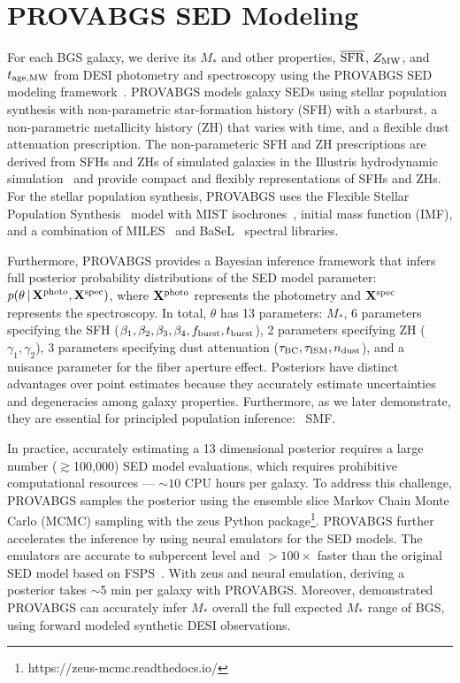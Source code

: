 \section{PROVABGS SED Modeling} \label{sec:provabgs}
For each BGS galaxy, we derive its $M_*$ and other properties, 
$\overline{\rm SFR}$, $Z_{\rm MW}$, and $t_{\rm age, MW}$ from DESI
photometry and spectroscopy using the PROVABGS SED modeling
framework~\citep{hahn2022}.  
PROVABGS models galaxy SEDs using stellar population synthesis with
non-parametric star-formation history (SFH) with a starburst, a non-parametric
metallicity history (ZH) that varies with time, and a flexible dust
attenuation prescription.
The non-parameteric SFH and ZH prescriptions are derived from SFHs and ZHs of
simulated galaxies in the Illustris hydrodynamic
simulation~\citep{vogelsberger2014, genel2014, nelson2015} and provide compact 
and flexibly representations of SFHs and ZHs.
For the stellar population synthesis, PROVABGS uses the Flexible Stellar
Population Synthesis~\citep[FSPS;][]{conroy2009, conroy2010b} model with MIST
isochrones~\citep{paxton2011, paxton2013, paxton2015, choi2016, dotter2016},
\cite{chabrier2003} initial mass function (IMF), and a combination of
MILES~\citep{sanchez-blazquez2006} and BaSeL~\citep{lejeune1997, lejeune1998,
westera2002} spectral libraries.

Furthermore, PROVABGS provides a Bayesian inference framework that infers
full posterior probability distributions of the SED model parameter:
$p(\theta\,|\, {\bf X}^{\rm photo}, {\bf X}^{\rm spec})$, where 
${\bf X}^{\rm photo}$ represents the photometry and ${\bf X}^{\rm spec}$ 
represents the spectroscopy. 
In total, $\theta$ has 13 parameters: $M_*$, 6 parameters specifying the SFH
($\beta_1, \beta_2, \beta_3, \beta_4, f_{\rm burst}, t_{\rm burst}$), 2
parameters specifying ZH ($\gamma_1, \gamma_2$), 3 parameters specifying
dust attenuation ($\tau_{\rm BC}, \tau_{\rm ISM}, n_{\rm dust}$), and a
nuisance parameter for the fiber aperture effect. 
Posteriors have distinct advantages over point estimates because they
accurately estimate uncertainties and degeneracies among galaxy properties.
Furthermore, as we later demonstrate, they are essential for principled
population inference: \eg~SMF.  

In practice, accurately estimating a 13 dimensional posterior requires a large
number ($\gtrsim$100,000) SED model evaluations, which requires prohibitive
computational resources --- $\sim 10$ CPU hours per galaxy. 
To address this challenge, PROVABGS samples the posterior using the
\cite{karamanis2020} ensemble slice Markov Chain Monte Carlo (MCMC) sampling
with the {\sc zeus} Python package\footnote{https://zeus-mcmc.readthedocs.io/}.
PROVABGS further accelerates the inference by using neural emulators for the
SED models. 
The emulators are accurate to subpercent level and $>100\times$ faster than the
original SED model based on FSPS~\citep{kwon2022}. 
With {\sc zeus} and neural emulation, deriving a posterior takes $\sim$5 min
per galaxy with PROVABGS.
Moreover, \cite{hahn2022} demonstrated PROVABGS can accurately infer $M_*$
overall the full expected $M_*$ range of BGS, using forward modeled synthetic
DESI observations. 

